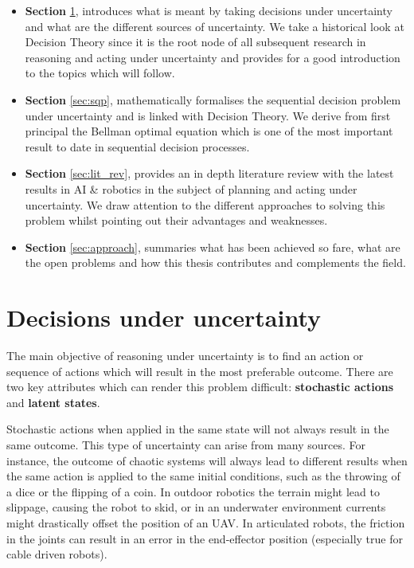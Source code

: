 \begin{itemize}
 \item \textbf{Section} \ref{sec:deci_un}, introduces what is meant by taking decisions under uncertainty and what are the different 
 sources of uncertainty. We take a historical look at Decision Theory since it is the root node of all subsequent research in reasoning 
 and acting under uncertainty and provides for a good introduction to the topics which will follow.  
 \item \textbf{Section} \ref{sec:sqp},  mathematically formalises the sequential decision problem under uncertainty and is linked with Decision Theory. We derive from first principal 
 the Bellman optimal equation which is one of the most important result to date in sequential decision processes.
 \item \textbf{Section} \ref{sec:lit_rev}, provides an in depth literature review with the latest results in AI \& robotics in the subject 
of planning and acting under uncertainty. We draw attention to the different approaches to solving this problem whilst pointing out
their advantages and weaknesses.
 \item \textbf{Section} \ref{sec:approach}, summaries what has been achieved so fare, what are the open problems and how this 
 thesis contributes and complements the field. 
\end{itemize}



\section{Decisions under uncertainty}\label{sec:deci_un}

The main objective of reasoning under uncertainty is to find an action or sequence of
actions which will result in the most preferable outcome. There are two key attributes which can render this 
problem difficult: \textbf{stochastic actions} and \textbf{latent states}. 

Stochastic actions when applied in the same state will not always result in the same outcome. This type of uncertainty 
can arise from many sources. For instance, the outcome of chaotic systems will always lead to different results when the same action is applied
to the same initial conditions, such as the throwing of a dice or the flipping of a coin. In outdoor robotics the terrain might lead to slippage, causing 
the robot to skid, or in an underwater environment currents might drastically offset the position of an UAV. In articulated robots, the friction in the joints 
can result in an error in the end-effector position (especially true for cable driven robots).

